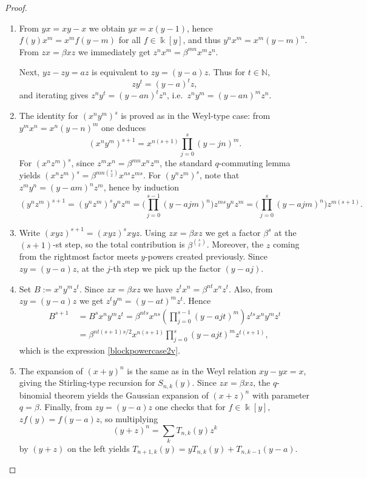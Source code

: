 \documentclass{amsart}
\theoremstyle{definition}
\theoremstyle{remark}
\numberwithin{equation}{section}
\begin{document}
\begin{proof}
\begin{enumerate}
\item [\rm (1)] From $yx=xy-x$ we obtain $yx=x(y-1)$, hence $f(y)x^m=x^m f(y-m)$ for all $f\in\Bbbk[y]$,
and thus $y^n x^m=x^m(y-m)^n$.
From $zx=\beta xz$ we immediately get $z^n x^m=\beta^{mn}x^m z^n$.

Next, $yz-zy=az$ is equivalent to $zy=(y-a)z$. Thus for $t\in \mathbb{N}$,
\[
z y^t=(y-a)^t z,
\]
and iterating gives $z^n y^t=(y-an)^t z^n$, i.e.\ $z^n y^m=(y-an)^m z^n$.

\item [\rm (2)] The identity for $(x^n y^m)^s$ is proved as in the Weyl-type case: from $y^m x^n=x^n (y-n)^m$ one deduces
\[
(x^n y^m)^{s+1}=x^{n(s+1)}\prod_{j=0}^{s}(y-jn)^m.
\]
For $(x^n z^m)^s$, since $z^m x^n=\beta^{mn}x^n z^m$, the standard $q$-commuting lemma yields $(x^n z^m)^s=\beta^{mn\binom{s}{2}}x^{ns}z^{ms}$.
For $(y^n z^m)^s$, note that $z^m y^n=(y-am)^n z^m$, hence by induction
\[
(y^n z^m)^{s+1}=(y^n z^m)^s y^n z^m
=\Big(\prod_{j=0}^{s-1}(y-ajm)^n\Big)z^{ms} y^n z^m
=\Big(\prod_{j=0}^{s}(y-ajm)^n\Big)z^{m(s+1)}.
\]

\item [\rm (3)] Write $(xyz)^{s+1}=(xyz)^s xyz$. Using $zx=\beta xz$ we get a factor $\beta^{s}$ at the $(s+1)$-st step, so the total contribution is $\beta^{\binom{s}{2}}$. Moreover, the $z$ coming from the rightmost factor meets $y$-powers created
previously. Since $zy = (y-a)z$, at the $j$-th step we pick up the factor $(y-aj)$.

\item [\rm (4)] Set $B:=x^n y^m z^t$. Since $zx=\beta xz$ we have $z^t x^n=\beta^{nt}x^n z^t$.
Also, from $zy=(y-a)z$ we get $z^t y^m=(y-at)^m z^t$. Hence
\begin{align*}
B^{s+1} &\ =B^s x^n y^m z^t
=\beta^{nt s}x^{ns}\left(\prod_{j=0}^{s-1}(y-aj t)^m\right)z^{ts}x^n y^m z^t \\
&\ =\beta^{nt(s+1)s/2} x^{n(s+1)}\prod_{j=0}^{s}(y-aj t)^m z^{t(s+1)},
\end{align*}
which is the expression \eqref{blockpowercase2v}.

\item [\rm (5)] The expansion of $(x+y)^n$ is the same as in the Weyl relation $xy-yx=x$, giving the Stirling-type recursion for $S_{n,k}(y)$. Since $zx=\beta xz$, the $q$-binomial theorem yields the Gaussian expansion of $(x+z)^n$ with parameter $q=\beta$.
Finally, from $zy=(y-a)z$ one checks that for $f\in\Bbbk[y]$, $zf(y)=f(y-a)z$, so multiplying
$$
(y+z)^n = \sum_k T_{n,k}(y)z^k
$$ 
by $(y+z)$ on the left yields $T_{n+1,k}(y) = yT_{n,k}(y)+T_{n,k-1}(y-a)$.
\end{enumerate}
\end{proof}
\end{document}
